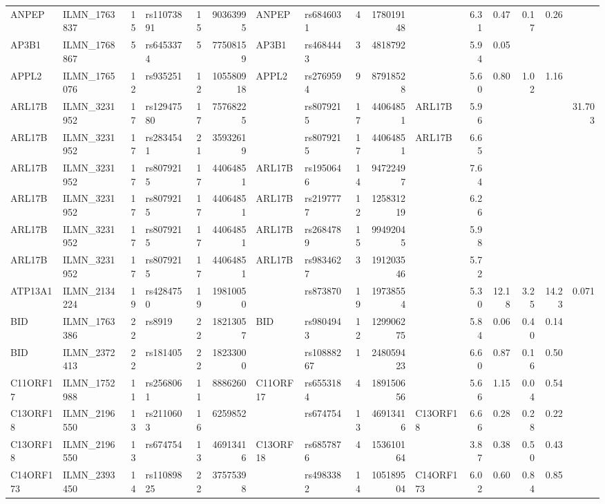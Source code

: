 \documentclass{article}
\begin{document}
\begin{landscape}
{\begin{ThreePartTable}
\begin{longtable}{|llr|lrrl|lrrl|rrrr|r|}
  ANPEP & ILMN\_1763837 & 15 & rs11073891 & 15 & 90363995 & ANPEP & rs6846031 & 4 & 178019148 &  & 6.31 & 0.47 & 0.17 & 0.26 &  \\
  AP3B1 & ILMN\_1768867 & 5 & rs6453374 & 5 & 77508159 & AP3B1 & rs4684443 & 3 & 4818792 &  & 5.94 & 0.05 &  &  &  \\
  APPL2 & ILMN\_1765076 & 12 & rs935251 & 12 & 105580918 & APPL2 & rs2769594 & 9 & 87918528 &  & 5.60 & 0.80 & 1.02 & 1.16 &  \\
  ARL17B & ILMN\_3231952 & 17 & rs12947580 & 17 & 75768225 &  & rs8079215 & 17 & 44064851 & ARL17B & 5.96 &  &  &  & 31.703 \\
  ARL17B & ILMN\_3231952 & 17 & rs2834541 & 21 & 35932619 &  & rs8079215 & 17 & 44064851 & ARL17B & 6.65 &  &  &  &  \\
  ARL17B & ILMN\_3231952 & 17 & rs8079215 & 17 & 44064851 & ARL17B & rs1950646 & 14 & 94722497 &  & 7.64 &  &  &  &  \\
  ARL17B & ILMN\_3231952 & 17 & rs8079215 & 17 & 44064851 & ARL17B & rs2197777 & 12 & 125831219 &  & 6.26 &  &  &  &  \\
  ARL17B & ILMN\_3231952 & 17 & rs8079215 & 17 & 44064851 & ARL17B & rs2684789 & 15 & 99492045 &  & 5.98 &  &  &  &  \\
  ARL17B & ILMN\_3231952 & 17 & rs8079215 & 17 & 44064851 & ARL17B & rs9834627 & 3 & 191203546 &  & 5.72 &  &  &  &  \\
  ATP13A1 & ILMN\_2134224 & 19 & rs4284750 & 19 & 19810050 &  & rs873870 & 19 & 19738554 &  & 5.30 & 12.18 & 3.25 & 14.23 & 0.071 \\
  BID & ILMN\_1763386 & 22 & rs8919 & 22 & 18213057 & BID & rs9804943 & 12 & 129906275 &  & 5.84 & 0.06 & 0.40 & 0.14 &  \\
  BID & ILMN\_2372413 & 22 & rs181405 & 22 & 18233000 &  & rs10888267 & 1 & 248059423 &  & 6.60 & 0.87 & 0.16 & 0.50 &  \\
  C11ORF17 & ILMN\_1752988 & 11 & rs2568061 & 11 & 8886260 & C11ORF17 & rs6553184 & 4 & 189150656 &  & 5.66 & 1.15 & 0.04 & 0.54 &  \\
  C13ORF18 & ILMN\_2196550 & 13 & rs2110603 & 16 & 6259852 &  & rs674754 & 13 & 46913416 & C13ORF18 & 6.66 & 0.28 & 0.28 & 0.22 &  \\
  C13ORF18 & ILMN\_2196550 & 13 & rs674754 & 13 & 46913416 & C13ORF18 & rs6857876 & 4 & 153610164 &  & 3.87 & 0.38 & 0.50 & 0.43 &  \\
  C14ORF173 & ILMN\_2393450 & 14 & rs11089825 & 22 & 37575398 &  & rs4983382 & 14 & 105189504 & C14ORF173 & 6.02 & 0.60 & 0.84 & 0.85 &  \\

\end{longtable}
\end{ThreePartTable}}
\end{landscape}
\end{document}
